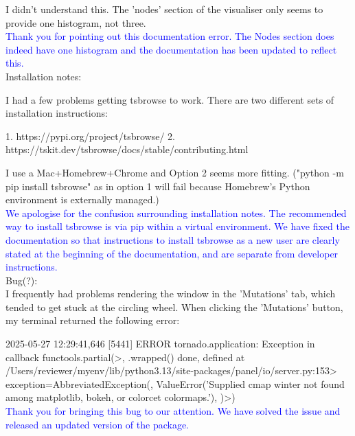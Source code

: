 \documentclass{article}
\begin{document}
I didn't understand this. The 'nodes' section of the visualiser only seems to provide one histogram, 
not three.\\
\textcolor{blue}{Thank you for pointing out this documentation error. The Nodes section 
does indeed have one histogram and the documentation has been updated to reflect this.}\\

Installation notes:

I had a few problems getting tsbrowse to work. There are two different sets of installation instructions:

1. https://pypi.org/project/tsbrowse/
2. https://tskit.dev/tsbrowse/docs/stable/contributing.html

I use a Mac+Homebrew+Chrome and Option 2 seems more fitting. ("python -m pip install tsbrowse" as in 
option 1 will fail because Homebrew's Python environment is externally managed.)\\
\textcolor{blue}{We apologise for the confusion surrounding installation notes. The recommended way to install 
tsbrowse is via pip within a virtual environment. We have fixed the documentation so that instructions 
to install tsbrowse as a new user are clearly stated at the beginning of the documentation,
and are separate from developer instructions.}\\

Bug(?):\\

I frequently had problems rendering the window in the 'Mutations' tab, which tended to get stuck at the 
circling wheel. When clicking the 'Mutations' button, my terminal returned the following error:

2025-05-27 12:29:41,646 [5441] ERROR    tornado.application: Exception in callback functools.partial(>, .wrapped() 
done, defined at \\
/Users/reviewer/myenv/lib/python3.13/site-packages/panel/io/server.py:153> 
exception=AbbreviatedException(, ValueError('Supplied cmap winter not found among matplotlib, bokeh, or colorcet 
colormaps.'), )>)\\
\textcolor{blue}{Thank you for bringing this bug to our attention. We have solved the issue and released an 
updated version of the package.}\\
\end{document}
